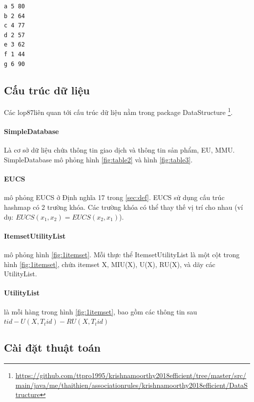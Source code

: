 \begin{lstlisting}[caption={tập tin item\_profit\_and\_minimum\_thresholds.txt}, label={lst:mmu}, language=bash]
a 5 80
b 2 64
c 4 77
d 2 57
e 3 62
f 1 44
g 6 90
\end{lstlisting}



\subsection{Cấu trúc dữ liệu}

Các lop87liên quan tới cấu trúc dữ liệu nằm trong package DataStructure \footnote{\url{https://github.com/ttpro1995/krishnamoorthy2018efficient/tree/master/src/main/java/me/thaithien/associationrules/krishnamoorthy2018efficient/DataStructure}}. 

\paragraph{SimpleDatabase} Là cơ sở dữ liệu chứa thông tin giao dịch và thông tin sản phẩm, EU, MMU. SimpleDatabase mô phỏng hình \ref{fig:table2} và hình \ref{fig:table3}.

\paragraph{EUCS} mô phỏng EUCS ở Định nghĩa 17 trong \ref{sec:def}. EUCS sử dụng cấu trúc hashmap có 2 trường khóa. Các trường khóa có thể thay thế vị trí cho nhau (ví dụ: $EUCS(x_1, x_2) = EUCS(x_2, x_1)$). 

\paragraph{ItemsetUtilityList} mô phỏng hình \ref{fig:1itemset}. Mỗi thực thể ItemsetUtilityList là một cột trong hình \ref{fig:1itemset}, chứa itemset X, MIU(X), U(X), RU(X), và dãy các UtilityList. 

\paragraph{UtilityList} là mỗi hàng trong hình \ref{fig:1itemset}, bao gồm các thông tin sau  $tid - U(X, T_tid) - RU(X, T_tid)$

\subsection{Cài đặt thuật toán}

